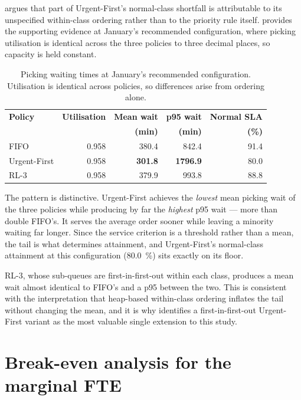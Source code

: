  argues that part of Urgent-First's normal-class shortfall is attributable
to its unspecified within-class ordering rather than to the priority rule itself.
 provides the supporting evidence at January's recommended configuration,
where picking utilisation is identical across the three policies to three decimal places, so
capacity is held constant.

\begin{table}[htbp]
\centering
\caption[Picking waiting times at January ]{Picking waiting times at January's
recommended configuration. Utilisation is identical across policies, so differences arise from
ordering alone.}
\label{tab:app-waits}
\small
\begin{tabular}{lrrrr}
\toprule
\textbf{Policy} & \textbf{Utilisation} & \textbf{Mean wait} & \textbf{p95 wait} &
\textbf{Normal SLA} \\
 & & \textbf{(min)} & \textbf{(min)} & \textbf{(\%)} \\
\midrule
FIFO         & 0.958 & 380.4 & 842.4  & 91.4 \\
Urgent-First & 0.958 & \textbf{301.8} & \textbf{1796.9} & 80.0 \\
RL-3         & 0.958 & 379.9 & 993.8  & 88.8 \\
\bottomrule
\end{tabular}
\end{table}

The pattern is distinctive. Urgent-First achieves the \emph{lowest} mean picking wait of the
three policies while producing by far the \emph{highest} p95 wait --- more than double FIFO's.
It serves the average order sooner while leaving a minority waiting far longer. Since the
service criterion is a threshold rather than a mean, the tail is what determines attainment,
and Urgent-First's normal-class attainment at this configuration (\SI{80.0}{\percent}) sits
exactly on its floor.

RL-3, whose sub-queues are first-in-first-out within each class, produces a mean wait almost
identical to FIFO's and a p95 between the two. This is consistent with the interpretation that
heap-based within-class ordering inflates the tail without changing the mean, and it is why
 identifies a first-in-first-out Urgent-First variant as the most valuable
single extension to this study.

\section{Break-even analysis for the marginal FTE}


